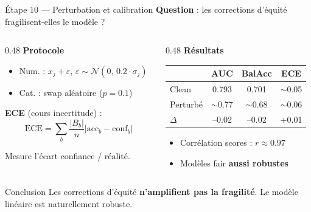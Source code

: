 \documentclass[aspectratio=169, 11pt]{beamer}
\begin{document}
\begin{frame}{\'Etape 10 --- Perturbation et calibration}
\textbf{Question} : les corrections d'\'equit\'e fragilisent-elles le mod\`ele ?

\vspace{0.5em}
\begin{columns}[T]
\begin{column}{0.48\textwidth}
\textbf{Protocole}
\begin{itemize}
    \item Num. : $x_j + \varepsilon$, $\varepsilon \sim \mathcal{N}(0,\, 0.2 \cdot \sigma_j)$
    \item Cat. : swap al\'eatoire ($p{=}0.1$)
\end{itemize}

\vspace{0.3em}
\textbf{ECE} (cours incertitude) :
$$\text{ECE} = \sum_{b} \frac{|B_b|}{n} |\text{acc}_b - \text{conf}_b|$$

\small Mesure l'\'ecart confiance / r\'ealit\'e.
\end{column}
\begin{column}{0.48\textwidth}
\textbf{R\'esultats}

\small
\begin{tabular}{lccc}
\toprule
& AUC & BalAcc & ECE \\
\midrule
Clean & 0.793 & 0.701 & $\sim$0.05 \\
Perturb\'e & $\sim$0.77 & $\sim$0.68 & $\sim$0.06 \\
$\Delta$ & --0.02 & --0.02 & +0.01 \\
\bottomrule
\end{tabular}

\vspace{0.3em}
\normalsize
\begin{itemize}
    \item Corr\'elation scores : $r \approx 0.97$
    \item Mod\`eles fair \textbf{aussi robustes}
\end{itemize}
\end{column}
\end{columns}

\vspace{0.3em}
\begin{exampleblock}{Conclusion}
Les corrections d'\'equit\'e \textbf{n'amplifient pas la fragilit\'e}. Le mod\`ele lin\'eaire est naturellement robuste.
\end{exampleblock}
\end{frame}
\end{document}
